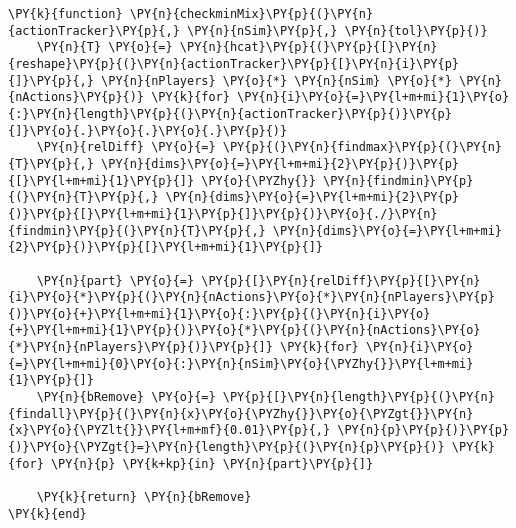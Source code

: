 \documentclass[main.tex]{subfiles}
\begin{document}
    \begin{tcolorbox}[breakable, size=fbox, boxrule=1pt, pad at break*=1mm,colback=cellbackground, colframe=cellborder]
\begin{Verbatim}[commandchars=\\\{\}]
\PY{k}{function} \PY{n}{checkminMix}\PY{p}{(}\PY{n}{actionTracker}\PY{p}{,} \PY{n}{nSim}\PY{p}{,} \PY{n}{tol}\PY{p}{)}
    \PY{n}{T} \PY{o}{=} \PY{n}{hcat}\PY{p}{(}\PY{p}{[}\PY{n}{reshape}\PY{p}{(}\PY{n}{actionTracker}\PY{p}{[}\PY{n}{i}\PY{p}{]}\PY{p}{,} \PY{n}{nPlayers} \PY{o}{*} \PY{n}{nSim} \PY{o}{*} \PY{n}{nActions}\PY{p}{)} \PY{k}{for} \PY{n}{i}\PY{o}{=}\PY{l+m+mi}{1}\PY{o}{:}\PY{n}{length}\PY{p}{(}\PY{n}{actionTracker}\PY{p}{)}\PY{p}{]}\PY{o}{.}\PY{o}{.}\PY{o}{.}\PY{p}{)}
    \PY{n}{relDiff} \PY{o}{=} \PY{p}{(}\PY{n}{findmax}\PY{p}{(}\PY{n}{T}\PY{p}{,} \PY{n}{dims}\PY{o}{=}\PY{l+m+mi}{2}\PY{p}{)}\PY{p}{[}\PY{l+m+mi}{1}\PY{p}{]} \PY{o}{\PYZhy{}} \PY{n}{findmin}\PY{p}{(}\PY{n}{T}\PY{p}{,} \PY{n}{dims}\PY{o}{=}\PY{l+m+mi}{2}\PY{p}{)}\PY{p}{[}\PY{l+m+mi}{1}\PY{p}{]}\PY{p}{)}\PY{o}{./}\PY{n}{findmin}\PY{p}{(}\PY{n}{T}\PY{p}{,} \PY{n}{dims}\PY{o}{=}\PY{l+m+mi}{2}\PY{p}{)}\PY{p}{[}\PY{l+m+mi}{1}\PY{p}{]}

    \PY{n}{part} \PY{o}{=} \PY{p}{[}\PY{n}{relDiff}\PY{p}{[}\PY{n}{i}\PY{o}{*}\PY{p}{(}\PY{n}{nActions}\PY{o}{*}\PY{n}{nPlayers}\PY{p}{)}\PY{o}{+}\PY{l+m+mi}{1}\PY{o}{:}\PY{p}{(}\PY{n}{i}\PY{o}{+}\PY{l+m+mi}{1}\PY{p}{)}\PY{o}{*}\PY{p}{(}\PY{n}{nActions}\PY{o}{*}\PY{n}{nPlayers}\PY{p}{)}\PY{p}{]} \PY{k}{for} \PY{n}{i}\PY{o}{=}\PY{l+m+mi}{0}\PY{o}{:}\PY{n}{nSim}\PY{o}{\PYZhy{}}\PY{l+m+mi}{1}\PY{p}{]}
    \PY{n}{bRemove} \PY{o}{=} \PY{p}{[}\PY{n}{length}\PY{p}{(}\PY{n}{findall}\PY{p}{(}\PY{n}{x}\PY{o}{\PYZhy{}}\PY{o}{\PYZgt{}}\PY{n}{x}\PY{o}{\PYZlt{}}\PY{l+m+mf}{0.01}\PY{p}{,} \PY{n}{p}\PY{p}{)}\PY{p}{)}\PY{o}{\PYZgt{}=}\PY{n}{length}\PY{p}{(}\PY{n}{p}\PY{p}{)} \PY{k}{for} \PY{n}{p} \PY{k+kp}{in} \PY{n}{part}\PY{p}{]}
    
    \PY{k}{return} \PY{n}{bRemove}
\PY{k}{end}
\end{Verbatim}
\end{tcolorbox}
\end{document}
